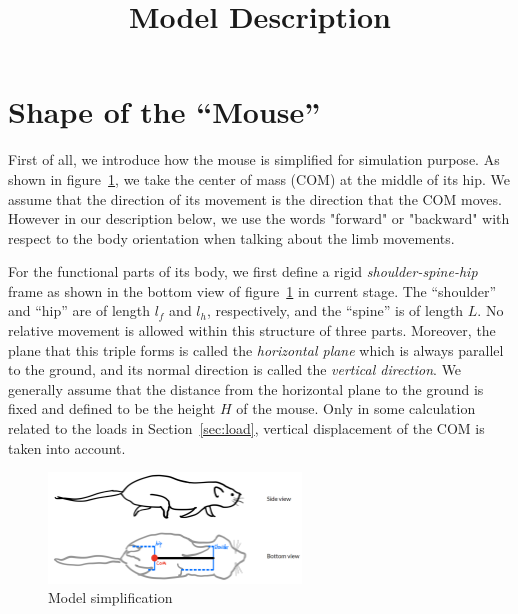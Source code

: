 \documentclass[11pt]{article}
\title{Model Description}
\date{}
\begin{document}
\maketitle

\section{Shape of the ``Mouse''}

First of all, we introduce how the mouse is simplified for simulation purpose. As shown in figure~\ref{fig:drawing}, we take the center of mass (COM) at the middle of its hip. We assume that the direction of its movement is the direction that the COM moves. However in our description below, we use the words "forward" or "backward" with respect to the body orientation when talking about the limb movements.

For the functional parts of its body, we first define a rigid \textit{shoulder-spine-hip} frame as shown in the bottom view of figure~\ref{fig:drawing} in current stage. The ``shoulder'' and ``hip'' are of length $ l_f $ and $ l_h $, respectively, and the ``spine'' is of length $ L $. No relative movement is allowed within this structure of three parts. Moreover, the plane that this triple forms is called the \textit{horizontal plane} which is always parallel to the ground, and its normal direction is called the \textit{vertical direction}. We generally assume that the distance from the horizontal plane to the ground is fixed and defined to be the height $ H $ of the mouse. Only in some calculation related to the loads in Section~\ref{sec:load}, vertical displacement of the COM is taken into account.

\begin{figure}[h]
	\centering
	\includegraphics[width=0.6\textwidth]{side_bottom_drawing.png}
	\caption{Model simplification}
	\label{fig:drawing}
\end{figure}
\end{document}
